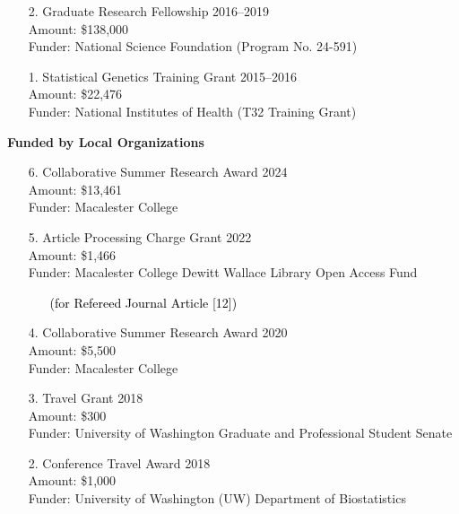 \documentclass[margin]{res}
\newcommand{\annotateItem}[1]{
	\begin{itemize} \vspace{-0.1cm}
	\item[] 
	\begin{footnotesize}\textcolor{black}{(#1)}\end{footnotesize}
	\end{itemize} \vspace{-0.1cm}
}
\begin{document}
\begin{resume}
\begin{itemize}
\item[2.] Graduate Research Fellowship \hfill 2016--2019 \\
Amount: \$138,000 \\
Funder: National Science Foundation (Program No. 24-591)

\item[1.] Statistical Genetics Training Grant \hfill 2015--2016  \\
Amount: \$22,476 \\
Funder: National Institutes of Health (T32 Training Grant) %
\end{itemize}

\textbf{Funded by Local Organizations} 
\begin{itemize}
\item[6.] Collaborative Summer Research Award \hfill 2024 \\
Amount: \$13,461\\
Funder: Macalester College


\item[5.] Article Processing Charge Grant \hfill 2022 \\ %
Amount: \$1,466 \\
Funder: Macalester College Dewitt Wallace Library Open Access Fund
  \annotateItem{for Refereed Journal Article [12]}
  


\item[4.] Collaborative Summer Research Award  \hfill 2020 \\ %
Amount:  \$5,500 \\
Funder: Macalester College

\item[3.] Travel Grant  \hfill 2018 \\ 
Amount: \$300 \\
Funder: University of Washington Graduate and Professional Student Senate 

\item[2.] Conference Travel Award \hfill 2018 \\
Amount: \$1,000 \\
Funder: University of Washington (UW) Department of Biostatistics


\end{itemize}
\end{resume}
\end{document}
